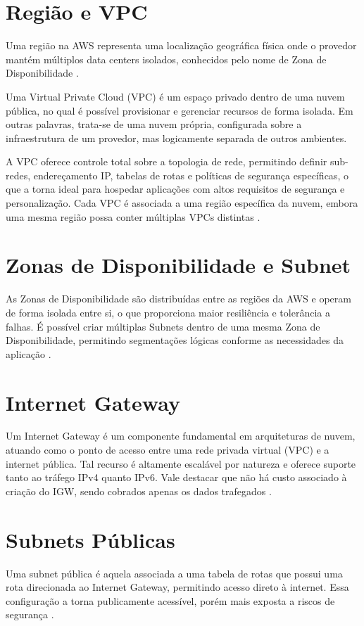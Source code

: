 \section{Região e VPC}Uma região na AWS representa uma localização geográfica física onde o provedor mantém múltiplos data centers isolados, conhecidos pelo nome de Zona de Disponibilidade \cite{techtarget2024regions}.

Uma Virtual Private Cloud (VPC) é um espaço privado dentro de uma nuvem pública, no qual é possível provisionar e gerenciar recursos de forma isolada. Em outras palavras, trata-se de uma nuvem própria, configurada sobre a infraestrutura de um provedor, mas logicamente separada de outros ambientes. 

A VPC oferece controle total sobre a topologia de rede, permitindo definir sub-redes, endereçamento IP, tabelas de rotas e políticas de segurança específicas, o que a torna ideal para hospedar aplicações com altos requisitos de segurança e personalização.
Cada VPC é associada a uma região específica da nuvem, embora uma mesma região possa conter múltiplas VPCs distintas \cite{cloudflare2024vpc}.

\section{Zonas de Disponibilidade e Subnet}As Zonas de Disponibilidade são distribuídas entre as regiões da AWS e operam de forma isolada entre si, o que proporciona maior resiliência e tolerância a falhas. É possível criar múltiplas Subnets dentro de uma mesma Zona de Disponibilidade, permitindo segmentações lógicas conforme as necessidades da aplicação \cite{aws2024az}.

\section{Internet Gateway}Um Internet Gateway é um componente fundamental em arquiteturas de nuvem, atuando como o ponto de acesso entre uma rede privada virtual (VPC) e a internet pública. Tal recurso é altamente escalável por natureza e oferece suporte tanto ao tráfego IPv4 quanto IPv6. Vale destacar que não há custo associado à criação do IGW, sendo cobrados apenas os dados trafegados \cite{akamai2024internetgateway}.

\section{Subnets Públicas}Uma subnet pública é aquela associada a uma tabela de rotas que possui uma rota direcionada ao Internet Gateway, permitindo acesso direto à internet. Essa configuração a torna publicamente acessível, porém mais exposta a riscos de segurança \cite{oracle2024topologia}.

